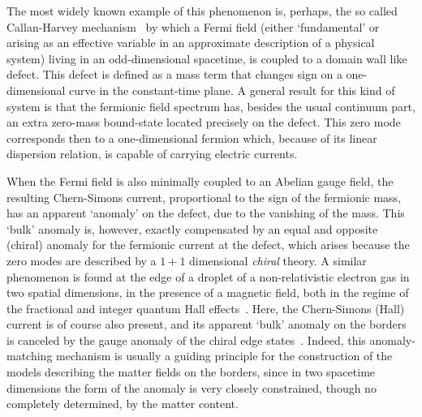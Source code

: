 \documentclass[a4paper,12pt]{article}
\begin{document}
The most widely known example of this phenomenon is, perhaps, the so
called Callan-Harvey mechanism~\cite{callan} by which a Fermi field
(either `fundamental' or arising as an effective variable in an
approximate description of a physical system) living in an
odd-dimensional spacetime, is coupled to a domain wall like defect.
This defect is defined as a mass term that changes sign on a
one-dimensional curve in the constant-time plane.  A general result
for this kind of system is that the fermionic field spectrum has,
besides the usual continuum part, an extra zero-mass bound-state
located precisely on the defect.  This zero mode corresponds then to a
one-dimensional fermion which, because of its linear dispersion
relation, is capable of carrying electric currents.

When the Fermi field is also minimally coupled to an Abelian gauge
field, the resulting Chern-Simons current, proportional to the
sign of the fermionic mass, has an apparent `anomaly' on the defect,
due to the vanishing of the mass. This `bulk' anomaly is, however,
exactly compensated by an equal and opposite (chiral) anomaly for the
fermionic current at the defect, which arises because the zero modes
are described by a $1+1$ dimensional {\em chiral\/} theory.  A similar
phenomenon is found at the edge of a droplet of a non-relativistic
electron gas in two spatial dimensions, in the presence of a magnetic
field, both in the regime of the fractional and integer quantum Hall
effects~\cite{frad}.  Here, the Chern-Simons (Hall) current is of course also
present, and its apparent `bulk' anomaly on the borders is canceled by
the gauge anomaly of the chiral edge states~\cite{wen,haldane}.
Indeed, this anomaly-matching mechanism is usually a guiding
principle for the construction of the models describing the matter
fields on the borders, since in two spacetime dimensions the form of
the anomaly is very closely constrained, though no completely
determined, by the matter content.
\end{document}
